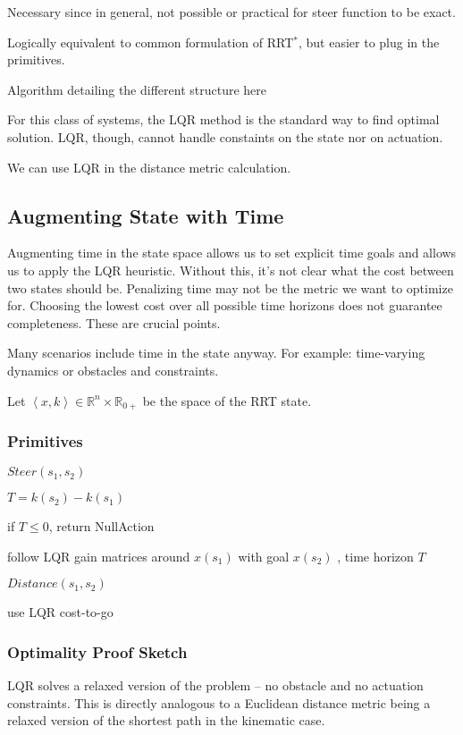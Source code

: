 \documentclass[letterpaper, 10pt, english, conference]{IEEEtran}
\begin{document}
Necessary since in general, not possible or practical for steer function
to be exact. 

Logically equivalent to common formulation of RRT$^*$, but easier to
plug in the primitives.

Algorithm detailing the different structure here 

For this class of systems, the LQR method is the standard way to find
optimal solution. LQR, though, cannot handle constaints on the state
nor on actuation.

We can use LQR in the distance metric calculation.


\subsection{Augmenting State with Time}

Augmenting time in the \rrtstar state space allows us to set explicit
time goals and allows us to apply the LQR heuristic. Without this,
it's not clear what the cost between two states should be. Penalizing
time may not be the metric we want to optimize for. Choosing the lowest
cost over all possible time horizons does not guarantee completeness.
These are crucial points.

Many scenarios include time in the state anyway. For example: time-varying
dynamics or obstacles and constraints. 

Let $\left\langle x,k\right\rangle \in\mathbb{R}^{n}\times\mathbb{R}_{0+}$
be the space of the RRT state.


\subsubsection{Primitives}

$Steer(s_{1},s_{2})$

$T=k\left(s_{2}\right)-k\left(s_{1}\right)$

if $T\leq0$, return NullAction

follow LQR gain matrices around $x\left(s_{1}\right)$ with goal $x\left(s_{2}\right)$
, time horizon $T$

$Distance(s_{1},s_{2})$

use LQR cost-to-go


\subsubsection{Optimality Proof Sketch}

LQR solves a relaxed version of the problem -- no obstacle and no
actuation constraints. This is directly analogous to a Euclidean distance
metric being a relaxed version of the shortest path in the kinematic
case.
\end{document}
